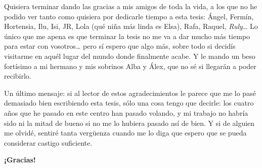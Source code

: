 	 Quisiera terminar dando las gracias a mis amigos de toda la
	vida, a los que no he podido ver tanto como quisiera por
	dedicarle tiempo a esta tesis: Ángel, Fermín, Hortensia, Ilu,
	Isi, JR, Lola (qué niña más linda es Elsa), Rafa, Raquel,
	\emph{Ruly}… Lo único que me apena es que terminar la tesis no
	me va a dar mucho más tiempo para estar con vosotros… pero sí
	espero que algo más, sobre todo si decidís visitarme en aquél
	lugar del mundo donde finalmente acabe. Y le mando un beso
	fortísimo a mi hermano y mis sobrinos Alba y Álex, que no sé si
	llegarán a poder recibirlo.
	
	 Un último mensaje: si al lector de estos agradecimientos le
	parece que me lo pasé demasiado bien escribiendo esta tesis,
	sólo una cosa tengo que decirle: los cuatro años que he
	pasado en este centro han pasado volando, y mi trabajo no
	habría sido ni la mitad de bueno si no me lo hubiera pasado así
	de bien. Y si de alguien me olvidé, sentiré tanta vergüenza
	cuando me lo diga que espero que se pueda considerar castigo
	suficiente.
	
	 \textbf{¡Gracias!}